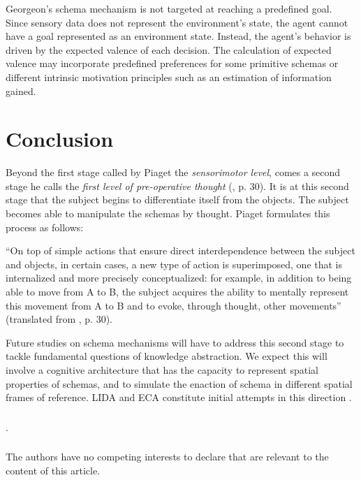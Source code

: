 \documentclass[runningheads]{llncs}
\begin{document}
Georgeon's schema mechanism is not targeted at reaching a predefined goal. Since sensory data does not represent the environment's state, the agent cannot have a goal represented as an environment state. Instead, the agent's behavior is driven by the expected valence of each decision. 
The calculation of expected valence may incorporate predefined preferences for some primitive schemas or different intrinsic motivation principles such as an estimation of information gained. 


\section{Conclusion}

Beyond the first stage called by Piaget the \textit{sensorimotor level}, comes a second stage he calls the \textit{first level of pre-operative thought} (\cite{piaget_lepistemologie_2011}, p. 30). 
It is at this second stage that the subject begins to differentiate itself from the objects. 
The subject becomes able to manipulate the schemas by thought. 
Piaget formulates this process as follows: 
\\

\begin{adjustwidth}{1cm}{1cm}
``On top of simple actions that ensure direct interdependence between the subject and objects, in certain cases, a new type of action is superimposed, one that is internalized and more precisely conceptualized: for example, in addition to being able to move from A to B, the subject acquires the ability to mentally represent this movement from A to B and to evoke, through thought, other movements'' (translated from \cite{piaget_lepistemologie_2011}, p. 30).\\

\end{adjustwidth}

Future studies on schema mechanisms will have to address this second stage to tackle fundamental questions of knowledge abstraction. 
We expect this will involve a cognitive architecture that has the capacity to represent spatial properties of schemas, and to simulate the enaction of schema in different spatial frames of reference. LIDA and ECA \cite{georgeon_artificial_2024} constitute initial attempts in this direction . 


\begin{credits}
\subsubsection{\ackname} .

\subsubsection{\discintname}
The authors have no competing interests to declare that are
relevant to the content of this article.
\end{credits}
%
%
%


%
\end{document}
